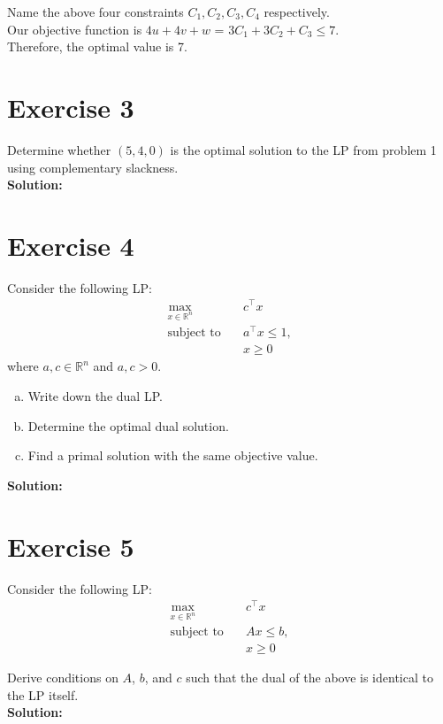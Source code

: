 \documentclass{article}
\begin{document}
Name the above four constraints $C_1, C_2, C_3, C_4$ respectively. \\

Our objective function is $4u + 4v + w$ = $3C_1 + 3C_2 + C_3 \leq 7$. \\

Therefore, the optimal value is 7.

\newpage

\section*{Exercise 3}
Determine whether $(5, 4, 0)$ is the optimal solution to the LP from problem 1 using complementary slackness. \\

\textbf{Solution:}



\newpage

\section*{Exercise 4}
Consider the following LP:
\begin{align*}
\max_{x \in \mathbb{R}^n} \quad & c^{\top} x \\
\text{subject to} \quad & a^{\top} x \leq 1, \\
& x \geq 0
\end{align*}
where $a, c \in \mathbb{R}^n$ and $a, c > 0$.

\begin{enumerate}[(a)]
    \item Write down the dual LP.
    \item Determine the optimal dual solution.
    \item Find a primal solution with the same objective value.
\end{enumerate}

\textbf{Solution:}



\newpage

\section*{Exercise 5}
Consider the following LP:
\begin{align*}
\max_{x \in \mathbb{R}^n} \quad & c^{\top} x \\
\text{subject to} \quad & Ax \leq b, \\
& x \geq 0
\end{align*}

Derive conditions on $A$, $b$, and $c$ such that the dual of the above is identical to the LP itself. \\

\textbf{Solution:}
\end{document}
